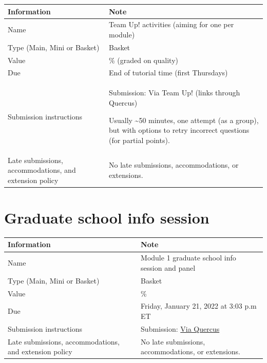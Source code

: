 \documentclass[
  openany]{book}
\begin{document}
\begin{longtable}[]{@{}
  >{\raggedright\arraybackslash}p{}
  >{\raggedright\arraybackslash}p{}@{}}
\toprule
\textbf{Information} & \textbf{Note} \\
\midrule
\endhead
Name & Team Up! activities (aiming for one per module) \\
Type (Main, Mini or Basket) & Basket \\
Value & 0.5\% (graded on quality) \\
Due & End of tutorial time (first Thursdays) \\
Submission instructions & Submission: Via Team Up! (links through Quercus)

Usually \textasciitilde50 minutes, one attempt (as a group), but with options to retry incorrect questions (for partial points). \\
Late submissions, accommodations, and extension policy & No late submissions, accommodations, or extensions. \\
\bottomrule
\end{longtable}

\hypertarget{graduate-school-info-session}{%
\section{Graduate school info session}\label{graduate-school-info-session}}

\begin{longtable}[]{@{}
  >{\raggedright\arraybackslash}p{}
  >{\raggedright\arraybackslash}p{}@{}}
\toprule
\textbf{Information} & \textbf{Note} \\
\midrule
\endhead
Name & Module 1 graduate school info session and panel \\
Type (Main, Mini or Basket) & Basket \\
Value & 0.1\% \\
Due & Friday, January 21, 2022 at 3:03 p.m ET \\
Submission instructions & Submission: \href{https://q.utoronto.ca/courses/253305/quizzes/239864}{Via Quercus} \\
Late submissions, accommodations, and extension policy & No late submissions, accommodations, or extensions. \\
\bottomrule
\end{longtable}
\end{document}
